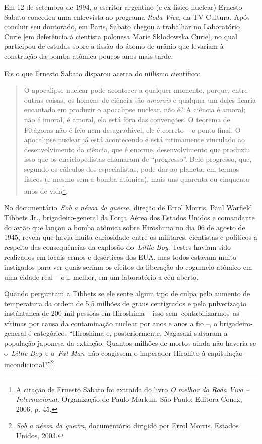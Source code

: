 Em 12 de setembro de 1994, o escritor argentino (e ex-físico nuclear)
Ernesto Sabato concedeu uma entrevista ao programa \emph{Roda Viva}, da
TV Cultura. Após concluir seu doutorado, em Paris, Sabato chegou a
trabalhar no Laboratório Curie {[}em deferência à cientista polonesa
Marie Skłodowska Curie{]}, no qual participou de estudos sobre a fissão
do átomo de urânio que levariam à construção da bomba atômica poucos
anos mais tarde.

Eis o que Ernesto Sabato disparou acerca do niilismo científico:

\begin{quote}
O apocalipse nuclear pode acontecer a qualquer momento, porque, entre
outras coisas, os homens de ciência são \emph{amorais} e qualquer um
deles ficaria encantado em produzir o apocalipse nuclear, não é? A
ciência é amoral; não é imoral, é amoral, ela está fora das convenções.
O teorema de Pitágoras não é feio nem desagradável, ele é correto -- e
ponto final. O apocalipse nuclear já está acontecendo e está intimamente
vinculado ao desenvolvimento da ciência, que é enorme, desenvolvimento
que produziu isso que os enciclopedistas chamaram de ``progresso''. Belo
progresso, que, segundo os cálculos dos especialistas, pode dar ao
planeta, em termos físicos (e mesmo sem a bomba atômica), mais uns
quarenta ou cinquenta anos de vida\footnote{A citação de Ernesto Sabato
  foi extraída do livro \emph{O melhor do Roda Viva -- Internacional.}
  Organização de Paulo Markun. São Paulo: Editora Conex, 2006, p. 45.}.
\end{quote}

No documentário~\emph{Sob a névoa da guerra}, direção de Errol Morris,
Paul Warfield Tibbets Jr., brigadeiro-general da Força Aérea dos Estados
Unidos e comandante do avião que lançou a bomba atômica sobre Hiroshima
no dia 06 de agosto de 1945, revela que havia muita curiosidade entre os
militares, cientistas e políticos a respeito das consequências da
explosão do~\emph{Little Boy}. Testes haviam sido realizados em locais
ermos e desérticos dos EUA, mas todos estavam muito instigados para ver
quais seriam os efeitos da liberação do cogumelo atômico em uma cidade
real -- ou, melhor, em um laboratório a céu aberto.

Quando perguntam a Tibbets se ele sente algum tipo de culpa pelo aumento
de temperatura da ordem de 5,5 milhões de graus centígrados e pela
pulverização instântanea de 200 mil pessoas em Hiroshima -- isso
sem~contabilizarmos~as vítimas por causa da contaminação nuclear por
anos e anos a fio --, o brigadeiro-general é categórico: ``Hiroshima e,
posteriormente, Nagasaki salvaram a população japonesa da extinção.
Quantos milhões de mortos ainda não haveria se o~\emph{Little Boy}~e
o~\emph{Fat Man}~não coagissem o imperador Hirohito à capitulação
incondicional?''\footnote{\emph{Sob a névoa da guerra}, documentário
  dirigido por Errol Morris. Estados Unidos, 2003.}


